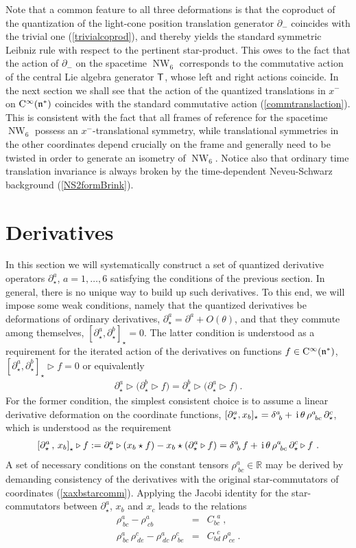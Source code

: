\documentclass[11pt,a4paper]{article}
\DeclareMathOperator{\NW}{NW}
\def\ii{{\,{\rm i}\,}}
\def\CC{{\rm C}}
\def\T{{\sf T}}
\def\mfn{{\mathfrak n}}
\newcommand{\newsection}{\setcounter{equation}{0}\section}
\newcommand{\real}{{\mathbb R}} %
\def\bea{\begin{eqnarray}}
\newcommand{\beq}{\begin{eqnarray}}
\newcommand{\eeq}{\end{eqnarray}}
\begin{document}
Note that a common feature to all three deformations is that the coproduct
of the quantization of the light-cone position translation generator
$\partial_-$ coincides with the trivial one (\ref{trivialcoprod}), and
thereby yields the standard symmetric Leibniz rule with respect to the
pertinent star-product. This owes to the fact that the action of
$\partial_-$ on the spacetime $\NW_6$ corresponds to the commutative
action of the central Lie algebra generator $\T$, whose left and right actions
coincide. In the next section we shall see that the action of the
quantized translations in $x^-$ on $\CC^\infty(\mfn^*)$ coincides with
the standard commutative action (\ref{commtranslaction}). This is
consistent with the fact that all frames of reference for the
spacetime $\NW_6$ possess an $x^-$-translational symmetry, while
translational symmetries in the other coordinates depend crucially on
the frame and generally need to be twisted in order to generate an
isometry of $\NW_6$. Notice also that ordinary time translation
invariance is always broken by the time-dependent Neveu-Schwarz
background (\ref{NS2formBrink}).

\newsection{Derivatives \label{Dervatives}}

In this section we will systematically construct a set of quantized
derivative operators $\partial^a_\star$, $a=1,\dots,6$ satisfying the
conditions of the previous section. In general, there is no unique way
to build up such derivatives. To this end, we will impose some weak
conditions, namely that the quantized derivatives be deformations of
ordinary derivatives, $\partial_\star^a=\partial^a+O(\theta)$, and
that they commute among themselves,
$[\partial_\star^a,\partial_\star^b]_\star=0$. The latter condition is
understood as a requirement for the iterated action of the derivatives
on functions $f\in\CC^\infty(\mfn^*)$,
$[\partial_\star^a,\partial_\star^b]_\star\triangleright f=0$ or
equivalently
\beq
\partial_\star^a\triangleright\bigl(\partial_\star^b\triangleright f
\bigr)=\partial_\star^b\triangleright\bigl(\partial_\star^a\triangleright
f\bigr) \ . 
\label{derivcommute}\eeq
For the former condition, the simplest consistent choice is to assume
a linear derivative deformation on the coordinate functions,
$[\partial_\star^a,x_b]_\star=
\delta^a_{~b}+\ii\theta\,\rho^a_{~bc}\,\partial^c_\star$, which is
understood as the requirement
\beq
\left[\partial_\star^a\,,\,x_b\right]_\star\triangleright f:=
\partial^a_\star\triangleright\left(x_b\star f\right)-
x_b\star\left(\partial_\star^a\triangleright f\right)=
\delta^a_{~b}\,f+\ii\theta\,\rho^a_{~bc}\,\partial^c_\star
\triangleright f \ .
\label{dxreq}\eeq
A set of necessary conditions on the constant tensors
$\rho^a_{~bc}\in\real$ may be derived by demanding consistency of the
derivatives with the original star-commutators of coordinates
(\ref{xaxbstarcomm}). Applying the Jacobi identity for the
star-commutators between $\partial^a_\star$, $x_b$ and $x_c$ leads to
the relations
\bea
\rho^a_{~bc}-\rho^a_{~cb}&=&C_{bc}^{~~a} \ , \nonumber\\
\rho^a_{~bc}\,\rho^c_{~de}-\rho^a_{~dc}\,\rho^c_{~be}&=&
C_{bd}^{~~c}\,\rho^a_{~ce} \ .
\label{rhoCrels}\eeq
\end{document}
